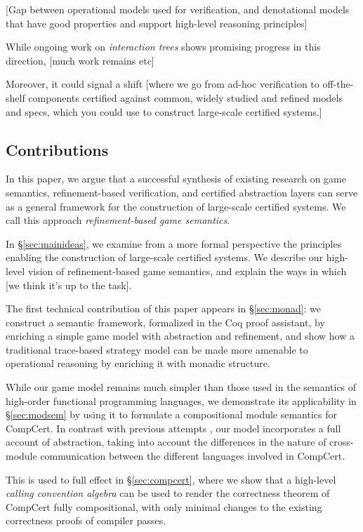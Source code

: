 \documentclass[acmsmall,timestamp,review]{acmart}
\begin{document}
[Gap between operational models used for verification,
and denotational models that have good properties
and support high-level reasoning principles]

While ongoing work on \emph{interaction trees} \cite{itrees}
shows promising progress in this direction,
[much work remains etc]

Moreover,
it could signal a shift
[where we go from ad-hoc verification to
off-the-shelf components
certified against common, widely studied and refined
models and specs,
which you could use to construct large-scale certified systems.]


\subsection{Contributions} %

In this paper,
we argue that
a successful synthesis of existing research
on game semantics,
refinement-based verification,
and certified abstraction layers
can serve as a general framework
for the construction of large-scale certified systems.
We call this approach \emph{refinement-based game semantics}.

In \S\ref{sec:mainideas},
we examine from a more formal perspective
the principles enabling the construction
of large-scale certified systems.
We describe our high-level vision of
refinement-based game semantics,
and explain the ways in which
[we think it's up to the task].

The first technical contribution of this paper
appears in \S\ref{sec:monad}:
we construct a semantic framework, formalized in the Coq proof assistant,
by enriching a simple game model
with abstraction and refinement,
and show how a traditional
trace-based strategy model
can be made more amenable to operational reasoning
by enriching it with monadic structure.

While our game model remains much simpler than
those used in the semantics of high-order
functional programming languages,
we demonstrate its applicability in \S\ref{sec:modsem}
by using it to formulate a compositional module semantics
for CompCert.
In contrast with previous attempts \cite{compcompcert,cpp15},
our model incorporates a full account of abstraction,
taking into account the differences in
the nature of cross-module communication
between the different languages involved in CompCert.

This is used to full effect in \S\ref{sec:compcert},
where we show that a high-level
\emph{calling convention algebra}
can be used to render the correctness theorem of CompCert
fully compositional,
with only minimal changes to the existing correctness proofs
of compiler passes.
\end{document}

